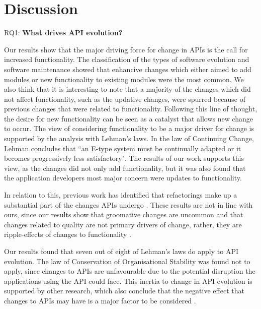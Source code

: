\documentclass{sig-alternate}
\begin{document}
\section{Discussion} \label{discussion}

\noindent
RQ1: \textbf{What drives API evolution?}
\smallskip

Our results show that the major driving force for change in APIs is the call for increased functionality. The classification of the types of software evolution and software maintenance showed that enhancive changes which either aimed to add modules or new functionality to existing modules were the most common. We also think that it is interesting to note that a majority of the changes which did not affect functionality, such as the updative changes, were spurred because of previous changes that were related to functionality. Following this line of thought, the desire for new functionality can be seen as a catalyst that allows new change to occur. The view of considering functionality to be a major driver for change is supported by the analysis with Lehman's laws. In the law of Continuing Change, Lehman concludes that ``an E-type system must be continually adapted or it becomes progressively less satisfactory". The results of our work supports this view, as the changes did not only add functionality, but it was also found that the application developers most major concern were updates to functionality. 

In relation to this, previous work has identified that refactorings make up a substantial part of the changes APIs undergo \cite{dig2005role, dig2006apis, henkel2005catchup, xing2006refactoring}. These results are not in line with ours, since our results show that groomative changes are uncommon and that changes related to quality are not primary drivers of change, rather, they are ripple-effects of changes to functionality \cite{robbes2012developers}.  

Our results found that seven out of eight of Lehman's laws do apply to API evolution. The law of Conservation of Organisational Stability was found not to apply, since changes to APIs are unfavourable due to the potential disruption the applications using the API could face. This inertia to change in API evolution is supported by other research, which also conclude that the negative effect that changes to APIs may have is a major factor to be considered \cite{google_talk, henning2007api, mcdonnell2013empirical, robbes2012developers}. 
\end{document}
